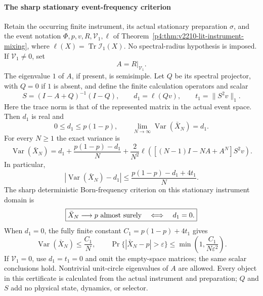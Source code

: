 \documentclass[12pt,a4paper]{article}
\begin{document}
\paragraph{The sharp stationary event-frequency criterion}
\begin{theorem}
\label{p4:thm:v255-sharp-event-frequency}
Retain the occurring finite instrument, its actual stationary preparation
$\sigma$, and the event notation $\Phi,p,v,R,\mathcal V_1,\ell$ of
Theorem~\ref{p4:thm:v2210-lit-instrument-mixing}, where
$\ell(X)=\operatorname{Tr}\mathcal I_1(X)$. No spectral-radius
hypothesis is imposed. If $\mathcal V_1\ne0$, set
\[
 A=R|_{\mathcal V_1}.
\]
The eigenvalue $1$ of $A$, if present, is semisimple. Let $Q$ be its
spectral projector, with $Q=0$ if $1$ is absent, and define the finite
calculation operators and scalar
\begin{equation}
 S=(I-A+Q)^{-1}(I-Q),\qquad
 d_1=\ell(Qv),\qquad t_1=\|S^2v\|_1.
 \label{p4:eq:v255-event-group-inverse}
\end{equation}
Here the trace norm is that of the represented matrix in the actual event
space. Then $d_1$ is real and
\begin{equation}
 0\le d_1\le p(1-p),\qquad
 \lim_{N\to\infty}\operatorname{Var}(\bar X_N)=d_1.
 \label{p4:eq:v255-event-variance-floor}
\end{equation}
For every $N\ge1$ the exact variance is
\begin{equation}
 \boxed{
 \operatorname{Var}(\bar X_N)
 =d_1+\frac{p(1-p)-d_1}{N}
 +\frac2{N^2}\ell\!\left(
       [(N-1)I-NA+A^N]S^2v\right).}
 \label{p4:eq:v255-exact-event-variance}
\end{equation}
In particular,
\begin{equation}
 \left|\operatorname{Var}(\bar X_N)-d_1\right|
 \le\frac{p(1-p)-d_1+4t_1}{N}.
 \label{p4:eq:v255-event-variance-budget}
\end{equation}
The sharp deterministic Born-frequency criterion on this stationary
instrument domain is
\begin{equation}
 \boxed{
 \bar X_N\longrightarrow p\ \hbox{almost surely}
 \quad\Longleftrightarrow\quad d_1=0.}
 \label{p4:eq:v255-sharp-born-frequency-iff}
\end{equation}
When $d_1=0$, the fully finite constant
$C_1=p(1-p)+4t_1$ gives
\begin{equation}
 \operatorname{Var}(\bar X_N)\le\frac{C_1}{N},\qquad
 \Pr\{|\bar X_N-p|>\varepsilon\}
 \le\min\!\left(1,\frac{C_1}{N\varepsilon^2}\right).
 \label{p4:eq:v255-nonmixing-frequency-error}
\end{equation}
If $\mathcal V_1=0$, use $d_1=t_1=0$ and omit the empty-space matrices;
the same scalar conclusions hold. Nontrivial unit-circle eigenvalues
of $A$ are allowed. Every object in this certificate is calculated from
the actual instrument and preparation; $Q$ and $S$ add no physical
state, dynamics, or selector.
\end{theorem}
\end{document}
